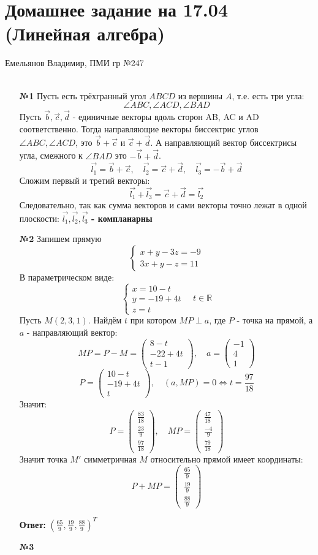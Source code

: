 \documentclass[a4paper]{article}
\newcommand{\mat}[1]{\begin{pmatrix} #1 \end{pmatrix}}
\renewcommand{\f}[2]{\frac{#1}{#2}}
\newcommand{\case}[1]{\begin{cases} #1 \end{cases}}
\newcommand{\lr}{\Leftrightarrow}
\newcommand{\RR}{\mathbb{R}}
\begin{document}
\section*{Домашнее задание на 17.04 (Линейная алгебра)}
 {\large Емельянов Владимир, ПМИ гр №247}\\\\
\begin{enumerate}
    \item[\textbf{№1}]Пусть есть трёхгранный угол $ABCD$ из вершины $A$, т.е. есть три угла: 
    $$\angle ABC, \angle ACD, \angle BAD$$
    Пусть $\vec{b}, \vec{c}, \vec{d}$ - единичные векторы вдоль сторон AB, AC и AD соответственно.
    Тогда направляющие векторы биссектрис углов $\angle ABC, \angle ACD$, это $\vec{b}+ \vec{c}$ и $ \vec{c}+\vec{d}$.
    А направляющий вектор биссектрисы угла, смежного к $\angle BAD$ это $-\vec{b}+\vec{d}$.
    $$\vec{l_1} = \vec{b}+ \vec{c}, \quad \vec{l_2} = \vec{c}+\vec{d}, \quad \vec{l_3} = -\vec{b}+\vec{d}$$
    Сложим первый и третий векторы:
    $$\vec{l_1} + \vec{l_3 } =  \vec{c}+\vec{d} = \vec{l_2}$$
    Следовательно, так как сумма векторов и сами векторы точно лежат в одной плоскости:
     \textbf{$\vec{l_1}, \vec{l_2}, \vec{l_3}$ - компланарны}\\


    \item[\textbf{№2}]Запишем прямую
    $$\case{
        x + y - 3z = -9\\
        3x+y-z=11
    }$$
    В параметрическом виде:
    $$\case{
        x = 10 - t\\
        y = -19 + 4t\\
        z = t
    } \quad t\in \RR$$
    Пусть $M(2, 3, 1)$. Найдём $t$ при котором $MP \perp a$, где $P$ - точка на прямой, а $a$ - направляющий вектор:
    $$MP = P-M = \mat{8-t\\-22+4t\\t-1}, \quad a = \mat{-1\\4\\1}$$
    $$P = \mat{10-t\\-19+4t\\t}, \quad (a, MP) = 0 \lr t = \f{97}{18}$$
    Значит:
    $$P = \begin{pmatrix} \frac{83}{18}\\ \frac{23}{9}\\ \frac{97}{18} \end{pmatrix}, \quad MP = \mat{\frac{47}{18}\\ \frac{-4}{9}\\ \frac{79}{18}}$$
    Значит точка $M'$ симметричная $M$ относительно прямой имеет координаты:
    $$P + MP = \begin{pmatrix} \frac{65}{9} \\ \frac{19}{9} \\ \frac{88}{9} \end{pmatrix}$$   

    \textbf{Ответ: } $(\frac{65}{9}, \frac{19}{9}, \frac{88}{9})^T$\\

    \item[\textbf{№3}]
\end{enumerate}
\end{document}
